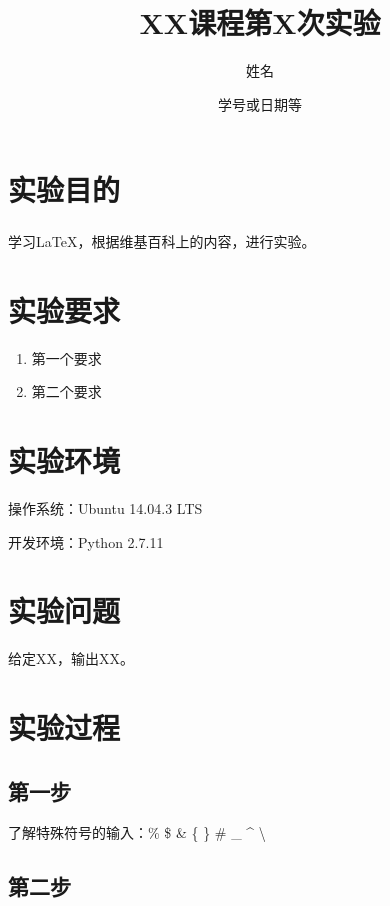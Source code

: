 \documentclass[a4paper, 12pt]{article}
\begin{document}
\title{XX课程第X次实验}
\author{姓名}
\date{学号或日期等}
\maketitle

\section{实验目的}

学习\LaTeX{}，根据维基百科上的内容\textsuperscript{\cite{ref-1}}，进行实验。


\section{实验要求}

\begin{enumerate}

    \item 第一个要求

    \item 第二个要求

\end{enumerate}


\section{实验环境}

操作系统：Ubuntu 14.04.3 LTS

开发环境：Python 2.7.11


\section{实验问题}

给定XX，输出XX。


\section{实验过程}

\subsection{第一步}

了解特殊符号的输入：\% \$ \& \{ \} \# \_ \^{} \textbackslash

\subsection{第二步}
\end{document}

